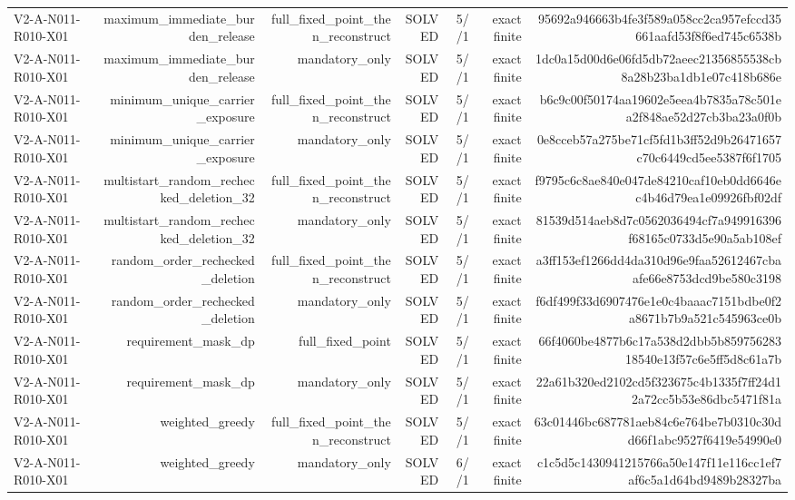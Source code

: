 {\begin{longtable}{lrrrrrr}
V2-A-N011-R010-X01 & maximum\_immediate\_burden\_release & full\_fixed\_point\_then\_reconstruct & SOLVED & 5//1 & exact finite & 95692a946663b4fe3f589a058cc2ca957efccd35661aafd53f8f6ed745c6538b \\
V2-A-N011-R010-X01 & maximum\_immediate\_burden\_release & mandatory\_only & SOLVED & 5//1 & exact finite & 1dc0a15d00d6e06fd5db72aeec21356855538cb8a28b23ba1db1e07c418b686e \\
V2-A-N011-R010-X01 & minimum\_unique\_carrier\_exposure & full\_fixed\_point\_then\_reconstruct & SOLVED & 5//1 & exact finite & b6c9c00f50174aa19602e5eea4b7835a78c501ea2f848ae52d27cb3ba23a0f0b \\
V2-A-N011-R010-X01 & minimum\_unique\_carrier\_exposure & mandatory\_only & SOLVED & 5//1 & exact finite & 0e8cceb57a275be71cf5fd1b3ff52d9b26471657c70c6449cd5ee5387f6f1705 \\
V2-A-N011-R010-X01 & multistart\_random\_rechecked\_deletion\_32 & full\_fixed\_point\_then\_reconstruct & SOLVED & 5//1 & exact finite & f9795c6c8ae840e047de84210caf10eb0dd6646ec4b46d79ea1e09926fbf02df \\
V2-A-N011-R010-X01 & multistart\_random\_rechecked\_deletion\_32 & mandatory\_only & SOLVED & 5//1 & exact finite & 81539d514aeb8d7c0562036494cf7a949916396f68165c0733d5e90a5ab108ef \\
V2-A-N011-R010-X01 & random\_order\_rechecked\_deletion & full\_fixed\_point\_then\_reconstruct & SOLVED & 5//1 & exact finite & a3ff153ef1266dd4da310d96e9faa52612467cbaafe66e8753dcd9be580c3198 \\
V2-A-N011-R010-X01 & random\_order\_rechecked\_deletion & mandatory\_only & SOLVED & 5//1 & exact finite & f6df499f33d6907476e1e0c4baaac7151bdbe0f2a8671b7b9a521c545963ce0b \\
V2-A-N011-R010-X01 & requirement\_mask\_dp & full\_fixed\_point & SOLVED & 5//1 & exact finite & 66f4060be4877b6c17a538d2dbb5b85975628318540e13f57c6e5ff5d8c61a7b \\
V2-A-N011-R010-X01 & requirement\_mask\_dp & mandatory\_only & SOLVED & 5//1 & exact finite & 22a61b320ed2102cd5f323675c4b1335f7ff24d12a72cc5b53e86dbc5471f81a \\
V2-A-N011-R010-X01 & weighted\_greedy & full\_fixed\_point\_then\_reconstruct & SOLVED & 5//1 & exact finite & 63c01446bc687781aeb84c6e764be7b0310c30dd66f1abc9527f6419e54990e0 \\
V2-A-N011-R010-X01 & weighted\_greedy & mandatory\_only & SOLVED & 6//1 & exact finite & c1c5d5c1430941215766a50e147f11e116cc1ef7af6c5a1d64bd9489b28327ba \\

\end{longtable}}
